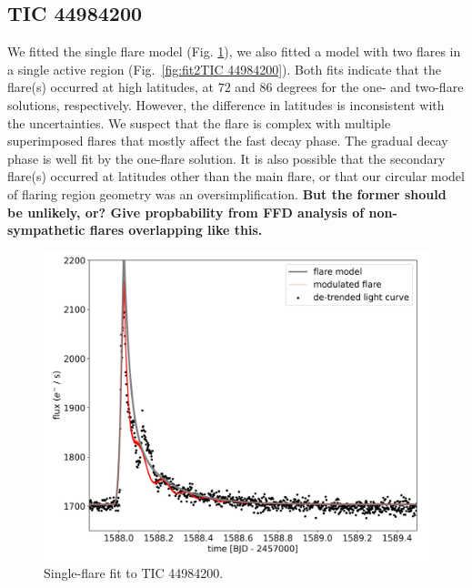 \documentclass[fleqn,usenatbib,letters]{mnras}%
\newcommand{\FB}{TIC 44984200} %
\begin{document}
\subsection{\FB}
We fitted the single flare model (Fig. \ref{fig:fit\FB}), we also fitted a model with two flares in a single active region (Fig.~\ref{fig:fit2\FB}). Both fits indicate that the flare(s) occurred at high latitudes, at $72$ and $86$ degrees for the one- and two-flare solutions, respectively. However, the difference in latitudes is inconsistent with the uncertainties. We suspect that the flare is complex with multiple superimposed flares that mostly affect the fast decay phase. The gradual decay phase is well fit by the one-flare solution. It is also possible that the secondary flare(s) occurred at latitudes other than the main flare, or that our circular model of flaring region geometry was an oversimplification. \textbf{But the former should be unlikely, or? Give propbability from FFD analysis of non-sympathetic flares overlapping like this.}
\begin{figure}
	\includegraphics[width=\columnwidth]{figures/02_08_2020_17_44_TIC44984200_flarefit_50retrievals.png}
    \caption{Single-flare fit to \FB.}
    \label{fig:fit\FB}
\end{figure}
\end{document}
